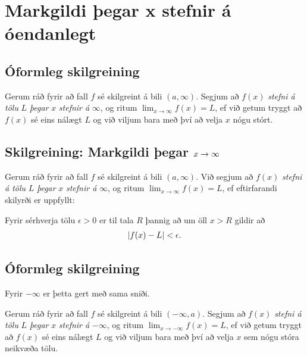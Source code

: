 \documentclass[b5paper,10pt,icelandic]{sphinxmanual}
\begin{document}
\section{Markgildi þegar x stefnir á óendanlegt}
\label{kafli02:markgildi-egar-x-stefnir-a-oendanlegt}


\subsection{Óformleg skilgreining}
\label{kafli02:id4}\label{kafli02:index-4}
Gerum ráð fyrir að fall \(f\) sé skilgreint á bili
\((a, \infty)\). Segjum að \(f(x)\) \emph{stefni á tölu} \(L\)
\emph{þegar} \(x\) \emph{stefnir á} \(\infty\), og ritum
\(\lim_{x\rightarrow \infty} f(x)=L\), ef við getum tryggt að
\(f(x)\) sé eins nálægt \(L\) og við viljum bara með því að
velja \(x\) nógu stórt.


\subsection{Skilgreining: Markgildi þegar \protect\(x \to \infty\protect\)}
\label{kafli02:skilgreining-markgildi-egar}
Gerum ráð fyrir að fall \(f\) sé skilgreint á bili
\((a,\infty)\). Við segjum að \(f(x)\) \emph{stefni á tölu} \(L\)
\emph{þegar} \(x\) \emph{stefnir á} \(\infty\), og ritum
\(\lim_{x\rightarrow \infty} f(x)=L\), ef eftirfarandi skilyrði er
uppfyllt:

Fyrir sérhverja tölu \(\epsilon>0\) er til tala \(R\)
þannig að um öll \(x>R\) gildir að
\begin{gather}
\begin{split}|f(x)-L|<\epsilon.\end{split}\notag
\end{gather}

\subsection{Óformleg skilgreining}
\label{kafli02:id5}
Fyrir \(-\infty\) er þetta gert með sama sniði.

Gerum ráð fyrir að fall \(f\) sé skilgreint á bili
\((-\infty, a)\). Segjum að \(f(x)\) \emph{stefni á tölu} \(L\)
\emph{þegar} \(x\) \emph{stefnir á} \(-\infty\), og ritum
\(\lim_{x\rightarrow -\infty} f(x)=L\), ef við getum tryggt að
\(f(x)\) sé eins nálægt \(L\) og við viljum bara með því að
velja \(x\) sem nógu stóra neikvæða tölu.
\end{document}
